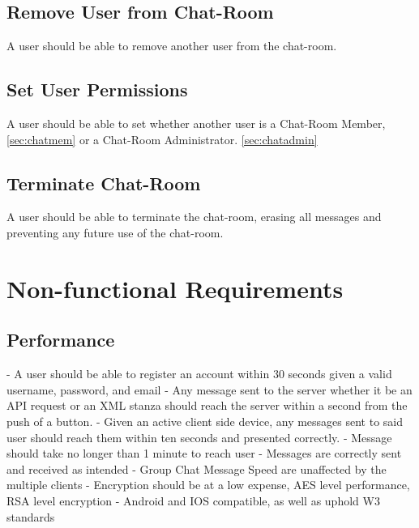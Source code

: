 \documentclass[11pt]{article}
\theoremstyle{plain}
\theoremstyle{definition}
\begin{document}
\subsection{Remove User from Chat-Room}
A user should be able to remove another user from the chat-room.
\subsection{Set User Permissions}
A user should be able to set whether another user is a Chat-Room Member, \ref{sec:chatmem} or a Chat-Room Administrator. \ref{sec:chatadmin}
\subsection{Terminate Chat-Room}
A user should be able to terminate the chat-room, erasing all messages and preventing any future use of the chat-room.

\section{Non-functional Requirements}\label{sec:nonfuncrequirements}
\subsection{Performance}
- A user should be able to register an account within 30 seconds given a valid username, 
  password, and email
\newline
- Any message sent to the server whether it be an API request or an XML stanza should reach 
  the server within a second from the push of a button.
\newline
- Given an active client side device, any messages sent to said user should reach them 
  within ten seconds and presented correctly. \newline
- Message should take no longer than 1 minute to reach user \newline
- Messages are correctly sent and received as intended \newline
- Group Chat Message Speed are unaffected by the multiple clients \newline
- Encryption should be at a low expense, AES level performance, RSA level encryption \newline
- Android and IOS compatible, as well as uphold W3 standards
\end{document}
